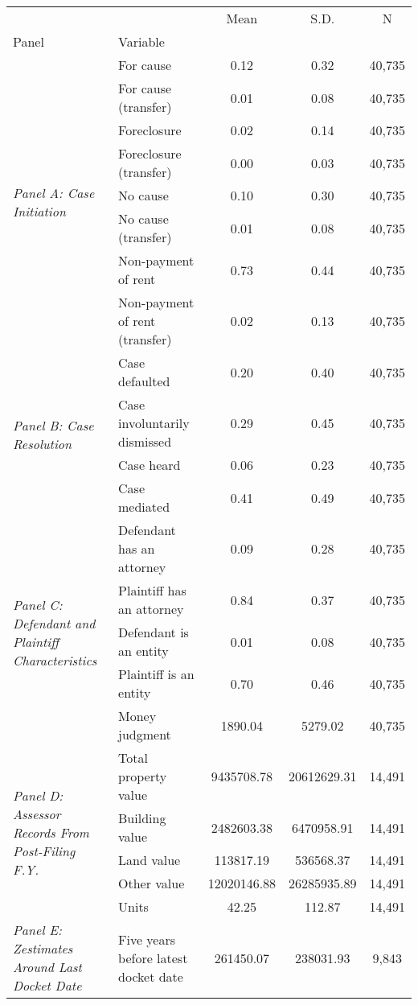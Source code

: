\begin{tabular}{llccc}
\toprule
 &  & Mean & S.D. & N \\
Panel & Variable &  &  &  \\
\midrule
\multirow[c]{8}{4cm}{\textit{Panel A: Case Initiation}} & For cause & 0.12 & 0.32 & 40,735 \\
 & For cause (transfer) & 0.01 & 0.08 & 40,735 \\
 & Foreclosure & 0.02 & 0.14 & 40,735 \\
 & Foreclosure (transfer) & 0.00 & 0.03 & 40,735 \\
 & No cause & 0.10 & 0.30 & 40,735 \\
 & No cause (transfer) & 0.01 & 0.08 & 40,735 \\
 & Non-payment of rent & 0.73 & 0.44 & 40,735 \\
 & Non-payment of rent (transfer) & 0.02 & 0.13 & 40,735 \\
\cline{1-5}
\multirow[c]{4}{4cm}{\textit{Panel B: Case Resolution}} & Case defaulted & 0.20 & 0.40 & 40,735 \\
 & Case involuntarily dismissed & 0.29 & 0.45 & 40,735 \\
 & Case heard & 0.06 & 0.23 & 40,735 \\
 & Case mediated & 0.41 & 0.49 & 40,735 \\
\cline{1-5}
\multirow[c]{5}{4cm}{\textit{Panel C: Defendant and Plaintiff Characteristics}} & Defendant has an attorney & 0.09 & 0.28 & 40,735 \\
 & Plaintiff has an attorney & 0.84 & 0.37 & 40,735 \\
 & Defendant is an entity & 0.01 & 0.08 & 40,735 \\
 & Plaintiff is an entity & 0.70 & 0.46 & 40,735 \\
 & Money judgment & 1890.04 & 5279.02 & 40,735 \\
\cline{1-5}
\multirow[c]{5}{4cm}{\textit{Panel D: Assessor Records From Post-Filing F.Y.}} & Total property value & 9435708.78 & 20612629.31 & 14,491 \\
 & Building value & 2482603.38 & 6470958.91 & 14,491 \\
 & Land value & 113817.19 & 536568.37 & 14,491 \\
 & Other value & 12020146.88 & 26285935.89 & 14,491 \\
 & Units & 42.25 & 112.87 & 14,491 \\
\cline{1-5}
\multirow[c]{9}{4cm}{\textit{Panel E: Zestimates Around Last Docket Date}} & Five years before latest docket date & 261450.07 & 238031.93 & 9,843 \\

\end{tabular}
